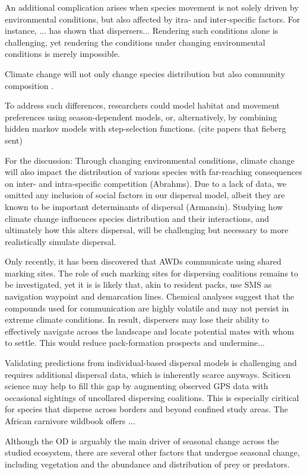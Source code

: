 \documentclass[abstract=on,10pt,a4paper,bibliography=totocnumbered]{article}
\begin{document}
An additional complication arises when species movement is not solely driven by
environmental conditions, but also affected by itra- and inter-specific factors.
For instance, ... has shown that dispersers...
Rendering such conditions alone is challenging, yet rendering the conditions
under changing environmental conditions is merely impossible.

Climate change will not only change species distribution but also community
composition \citep{Thuiller.2006}.

To address such differences, researchers could model
habitat and movement preferences using season-dependent models, or,
alternatively, by combining hidden markov models with step-selection functions.
(cite papers that fieberg sent)

For the discussion: Through changing environmental conditions, climate change
will also impact the distribution of various species with far-reaching
consequences on inter- and intra-specific competition (Abrahms). Due to a lack
of data, we omitted any inclusion of social factors in our dispersal model,
albeit they are known to be important determinants of dispersal (Armansin).
Studying how climate change influences species distribution and their
interactions, and ultimately how this alters dispersal, will be challenging but
necessary to more realistically simulate dispersal.


Only recently, it has been discovered that AWDs communicate using shared marking
sites. The role of such marking sites for dispersing coalitions remains to be
investigated, yet it is is likely that, akin to resident packs, use SMS as
navigation waypoint and demarcation lines. Chemical analyses suggest that the
compounds used for communication are highly volatile and may not persist in
extreme climate conditions. In result, dispersers may lose their ability to
effectively navigate across the landscape and locate potential mates with whom
to settle. This would reduce pack-formation prospects and undermine...

Validating predictions from individual-based dispersal models is challenging and
requires additional dispersal data, which is inherently scarce anyways. Sciticen
science may help to fill this gap by augmenting observed GPS data with
occasional sightings of uncollared dispersing coalitions. This is especially
ciritical for species that disperse across borders and beyond confined study
areas. The African carnivore wildbook offers ...

Although the OD is arguably the main driver of seasonal change across the
studied ecosystem, there are several other factors that undergoe seasonal
change, including vegetation and the abundance and distribution of prey or
predators.
\end{document}
